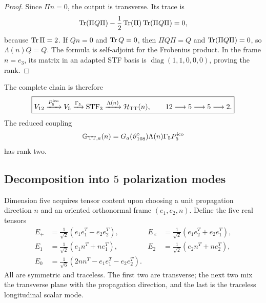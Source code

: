 \begin{proof}
Since \(\Pi n=0\), the output is transverse. Its trace is
\[
\operatorname{Tr}(\Pi Q\Pi)-\frac12\operatorname{Tr}(\Pi)\operatorname{Tr}(\Pi Q\Pi)=0,
\]
because \(\operatorname{Tr}\Pi=2\). If \(Qn=0\) and \(\operatorname{Tr} Q=0\), then
\(\Pi Q\Pi=Q\) and \(\operatorname{Tr}(\Pi Q\Pi)=0\), so
\(\Lambda(n)Q=Q\). The formula is self-adjoint for the Frobenius
product. In the frame \(n=e_3\), its matrix in an adapted STF basis is
\(\operatorname{diag}(1,1,0,0,0)\), proving the rank.
\end{proof}

The complete chain is therefore
\begin{equation}
\label{ii:pent:eq:gravity-12-5-5-2}
\boxed{
V_{12}\xrightarrow{P^{\mathrm{ico}}_5}V_5
\xrightarrow{\Gamma_5}\operatorname{STF}_3
\xrightarrow{\Lambda(n)}\mathcal H_{\rm TT}(n),
\qquad 12\longrightarrow5\longrightarrow5\longrightarrow2.}
\end{equation}
The reduced coupling
\begin{equation}
\label{ii:pent:eq:gravity-effective-map}
\mathbb G_{{\rm TT},a}(n)
=G_a(\vartheta^\circ_{108})\Lambda(n)\Gamma_5P^{\mathrm{ico}}_5
\end{equation}
has rank two.

\subsection{Decomposition into \(5\) polarization modes}

Dimension five acquires tensor content upon choosing a unit propagation
direction \(n\) and an oriented orthonormal frame
\((e_1,e_2,n)\). Define the five real tensors
\begin{align}
E_{+}&=\frac1{\sqrt2}(e_1e_1^T-e_2e_2^T),
&E_{\times}&=\frac1{\sqrt2}(e_1e_2^T+e_2e_1^T),
\label{ii:pent:eq:gravity-helicity2-real}\\
E_{1}&=\frac1{\sqrt2}(e_1n^T+ne_1^T),
&E_{2}&=\frac1{\sqrt2}(e_2n^T+ne_2^T),
\label{ii:pent:eq:gravity-helicity1-real}\\
E_{0}&=\frac1{\sqrt6}(2nn^T-e_1e_1^T-e_2e_2^T).
\label{ii:pent:eq:gravity-helicity0-real}
\end{align}
All are symmetric and traceless. The first two are transverse; the
next two mix the transverse plane with the propagation
direction, and the last is the traceless longitudinal scalar mode.

